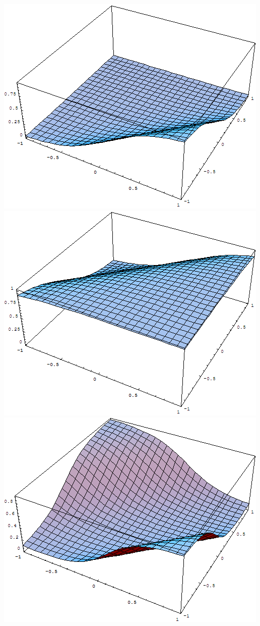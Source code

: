 \documentclass{article}
\begin{document}
\begin{enumerate}
    \begin{center}
      \includegraphics[scale=.35]{hidden1.png}
      \includegraphics[scale=.35]{hidden2.png}
      \includegraphics[scale=.35]{output.png}
    \end{center}


\end{enumerate}
\end{document}

